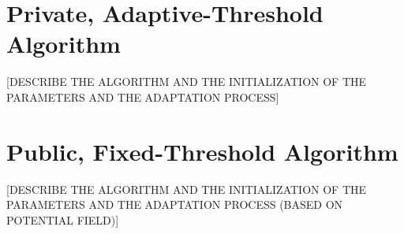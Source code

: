 \section{Private, Adaptive-Threshold Algorithm}
[DESCRIBE THE ALGORITHM AND THE INITIALIZATION OF THE PARAMETERS AND THE ADAPTATION PROCESS]
\section{Public, Fixed-Threshold Algorithm}
[DESCRIBE THE ALGORITHM AND THE INITIALIZATION OF THE PARAMETERS AND THE ADAPTATION PROCESS (BASED ON POTENTIAL FIELD)]

